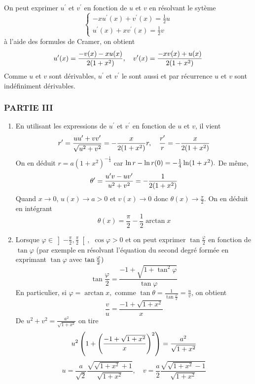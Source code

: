 \begin{enumerate}
On peut exprimer $u^{\prime }$ et $v^{\prime }$ en fonction de $u$
et $v$ en r{\'e}solvant le syt{\`e}me
\[
\left\{
\begin{array}{c}
-xu^{\prime }(x)+v^{\prime }(x)=\frac{1}{2}u \\
u^{\prime }(x)+xv^{\prime }(x)=\frac{1}{2}v
\end{array}
\right.
\]
{\`a} l'aide des formules de Cramer, on obtient
\[
u^{\prime }(x)=\frac{-v(x)-xu(x)}{2(1+x^{2})},\quad v^{\prime }(x)=\frac{%
-xv(x)+u(x)}{2(1+x^{2})}
\]
Comme $u$ et $v$ sont d{\'e}rivables, $u^{\prime }$ et $v^{\prime }$
le sont aussi et par r{\'e}currence $u$ et $v$ sont ind{\'e}finiment
d{\'e}rivables.
\end{enumerate}

\subsubsection*{PARTIE III}

\begin{enumerate}
\item  En utilisant les expressions de $u^{\prime }$ et $v^{\prime }$ en
fonction de $u$ et $v$, il vient
\[
r^{\prime }=\frac{uu^{\prime }+vv^{\prime }}{\sqrt{u^{2}+v^{2}}}=-\frac{x}{%
2(1+x^{2})}r,\quad \frac{r^{\prime }}{r}=-\frac{x}{2(1+x^{2})}
\]
On en d{\'e}duit $r=a(1+x^{2})^{-\frac{1}{4}}$ car $\ln r-\ln r(0)=-\frac{1}{%
4}\ln (1+x^{2}).$ De m{\^e}me,
\[
\theta ^{\prime }=\frac{u^{\prime }v-uv^{\prime }}{u^{2}+v^{2}}=-\frac{1}{%
2(1+x^{2})}
\]
Quand $x\rightarrow 0$, $u(x)\rightarrow a>0$ et $v(x)\rightarrow 0$ donc $%
\theta (x)\rightarrow \frac{\pi }{2}$. On en d{\'e}duit en int{\'e}grant
\[
\theta (x)=\frac{\pi }{2}-\frac{1}{2}\arctan x
\]

\item  Lorsque $\varphi \in \left] -\frac{\pi }{2},\frac{\pi }{2}\right[ ,$ $%
\cos \varphi >0$ et on peut exprimer $\tan \frac{\varphi }{2}$ en
fonction de $\tan \varphi $ (par exemple en r{\'e}solvant l'{\'e}quation
du second
degr{\'e} form{\'e}e en exprimant $\tan \varphi $ avec $\tan \frac{\varphi }{%
2})$%
\[
\tan \frac{\varphi }{2}=\frac{-1+\sqrt{1+\tan ^{2}\varphi }}{\tan
\varphi }
\]
En particulier, si $\varphi =\arctan x,$ comme $\tan \theta
=\frac{1}{\tan \frac{\varphi }{2}}=\frac{u}{v}$, on obtient
\[
\frac{v}{u}=\frac{-1+\sqrt{1+x^{2}}}{x}
\]
De $u^{2}+v^{2}=\frac{a^{2}}{\sqrt{1+x^{2}}}$ on tire
\[
u^{2}\left( 1+\left( \frac{-1+\sqrt{1+x^{2}}}{x}\right) ^{2}\right) =\frac{%
a^{2}}{\sqrt{1+x^{2}}}
\]
\[
u=\frac{a}{\sqrt{2}}\frac{\sqrt{\sqrt{1+x^{2}}+1}}{\sqrt{1+x^{2}}},\quad v=%
\frac{a}{2}\frac{\sqrt{\sqrt{1+x^{2}}-1}}{\sqrt{1+x^{2}}}
\]
\end{enumerate}

